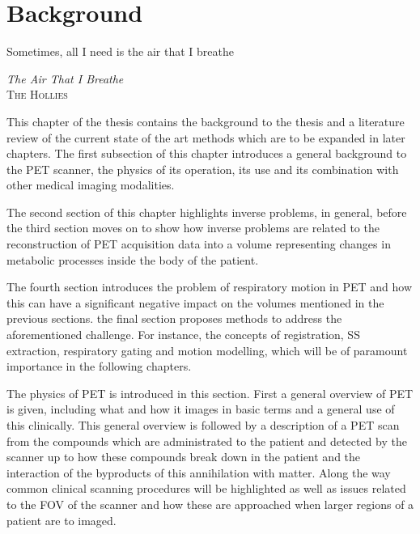 \chapter{Background} \label{sec:background}
    \vspace*{\fill}
    \setlength{\epigraphwidth}{0.5\linewidth}
    \renewcommand{\epigraphflush}{flushright}
    \renewcommand{\epigraphsize}{\footnotesize}
    \epigraph{Sometimes, all I need is the air that I breathe}%
              {\textit{The Air That I Breathe}\\ \textsc{The Hollies}}
    
    \newpage
    
        This chapter of the thesis contains the background to the thesis and a literature review of the current state of the art methods which are to be expanded in later chapters. The first subsection of this chapter introduces a general background to the \gls{PET} scanner, the physics of its operation, its use and its combination with other medical imaging modalities.
        
        The second section of this chapter highlights inverse problems, in general, before the third section moves on to show how inverse problems are related to the reconstruction of \gls{PET} acquisition data into a volume representing changes in metabolic processes inside the body of the patient.
        
        The fourth section introduces the problem of respiratory motion in \gls{PET} and how this can have a significant negative impact on the volumes mentioned in the previous sections. the final section proposes methods to address the aforementioned challenge. For instance, the concepts of registration, \gls{SS} extraction, respiratory gating and motion modelling, which will be of paramount importance in the following chapters.
    
        The physics of \gls{PET} is introduced in this section. First a general overview of \gls{PET} is given, including what and how it images in basic terms and a general use of this clinically. This general overview is followed by a description of a \gls{PET} scan from the compounds which are administrated to the patient and detected by the scanner up to how these compounds break down in the patient and the interaction of the byproducts of this annihilation with matter. Along the way common clinical scanning procedures will be highlighted as well as issues related to the \gls{FOV} of the scanner and how these are approached when larger regions of a patient are to imaged.
            
